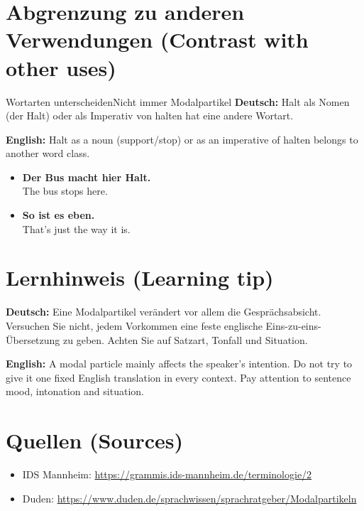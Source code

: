 \documentclass[a4paper,11pt]{article}
\newcommand{\GermanText}[1]{\textbf{Deutsch: }#1\par}
\newcommand{\EnglishText}[1]{{\small\color{SoftGray}\textbf{English: }#1\par}}
\newcommand{\ExampleItem}[2]{\item \textbf{#1}\\{\small\color{SoftGray}#2}}
\begin{document}
\section{Abgrenzung zu anderen Verwendungen \textnormal{(Contrast with other uses)}}
\begin{grammarentry}{Wortarten unterscheiden}{Nicht immer Modalpartikel}
\GermanText{Halt als Nomen (der Halt) oder als Imperativ von halten hat eine andere Wortart.}
\EnglishText{Halt as a noun (support/stop) or as an imperative of halten belongs to another word class.}
\end{grammarentry}
\begin{exbox}\begin{itemize}
\ExampleItem{Der Bus macht hier Halt.}{The bus stops here.}
\ExampleItem{So ist es eben.}{That's just the way it is.}
\end{itemize}\end{exbox}
\section{Lernhinweis \textnormal{(Learning tip)}}
\GermanText{Eine Modalpartikel verändert vor allem die Gesprächsabsicht. Versuchen Sie nicht, jedem Vorkommen eine feste englische Eins-zu-eins-Übersetzung zu geben. Achten Sie auf Satzart, Tonfall und Situation.}
\EnglishText{A modal particle mainly affects the speaker's intention. Do not try to give it one fixed English translation in every context. Pay attention to sentence mood, intonation and situation.}
\section{Quellen \textnormal{(Sources)}}
\begin{itemize}
\item IDS Mannheim: \url{https://grammis.ids-mannheim.de/terminologie/2}
\item Duden: \url{https://www.duden.de/sprachwissen/sprachratgeber/Modalpartikeln}
\end{itemize}
\end{document}
